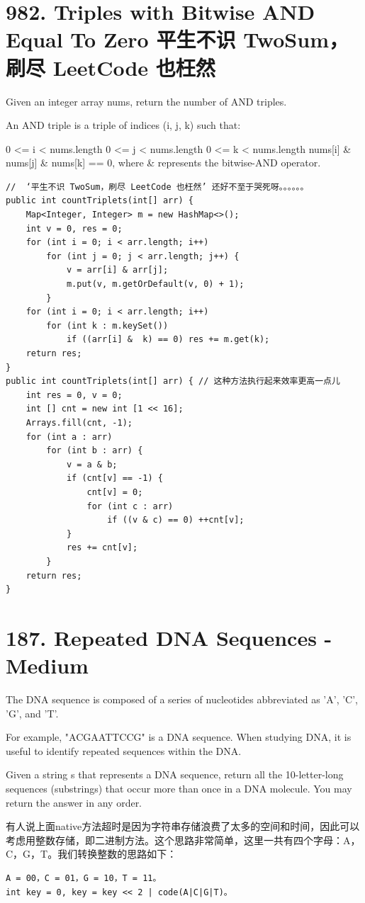 \documentclass[9pt, b5paaper]{book}
\begin{document}
\section{982. Triples with Bitwise AND Equal To Zero 平生不识 TwoSum，刷尽 LeetCode 也枉然}
\label{sec-10-6}
Given an integer array nums, return the number of AND triples.

An AND triple is a triple of indices (i, j, k) such that:

0 <= i < nums.length
0 <= j < nums.length
0 <= k < nums.length
nums[i] \& nums[j] \& nums[k] == 0, where \& represents the bitwise-AND operator.
\begin{verbatim}
//  ‘平生不识 TwoSum，刷尽 LeetCode 也枉然’ 还好不至于哭死呀。。。。。。
public int countTriplets(int[] arr) { 
    Map<Integer, Integer> m = new HashMap<>();
    int v = 0, res = 0;
    for (int i = 0; i < arr.length; i++) 
        for (int j = 0; j < arr.length; j++) {
            v = arr[i] & arr[j];
            m.put(v, m.getOrDefault(v, 0) + 1);
        }
    for (int i = 0; i < arr.length; i++) 
        for (int k : m.keySet()) 
            if ((arr[i] &  k) == 0) res += m.get(k);
    return res;
}
public int countTriplets(int[] arr) { // 这种方法执行起来效率更高一点儿
    int res = 0, v = 0;
    int [] cnt = new int [1 << 16];
    Arrays.fill(cnt, -1);
    for (int a : arr) 
        for (int b : arr) {
            v = a & b;
            if (cnt[v] == -1) {
                cnt[v] = 0;
                for (int c : arr) 
                    if ((v & c) == 0) ++cnt[v];
            }
            res += cnt[v];
        }
    return res;
}
\end{verbatim}

\section{187. Repeated DNA Sequences - Medium}
\label{sec-10-7}
The DNA sequence is composed of a series of nucleotides abbreviated as 'A', 'C', 'G', and 'T'.

For example, "ACGAATTCCG" is a DNA sequence.
When studying DNA, it is useful to identify repeated sequences within the DNA.

Given a string s that represents a DNA sequence, return all the 10-letter-long sequences (substrings) that occur more than once in a DNA molecule. You may return the answer in any order.

有人说上面native方法超时是因为字符串存储浪费了太多的空间和时间，因此可以考虑用整数存储，即二进制方法。这个思路非常简单，这里一共有四个字母：A，C，G，T。我们转换整数的思路如下：
\begin{verbatim}
A = 00，C = 01，G = 10，T = 11。
int key = 0, key = key << 2 | code(A|C|G|T)。
\end{verbatim}
\end{document}
